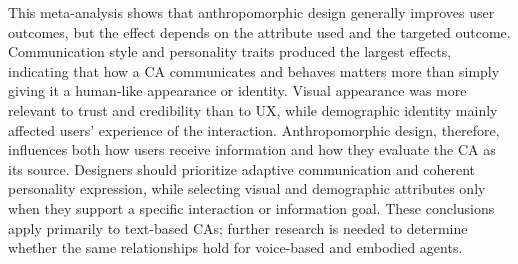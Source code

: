 \documentclass[preprint,review,12pt,authoryear,nonatbib]{elsarticle}
\begin{document}
This meta-analysis shows that anthropomorphic design generally improves user outcomes, but the effect depends on the attribute used and the targeted outcome. Communication style and personality traits produced the largest effects, indicating that how a CA communicates and behaves matters more than simply giving it a human-like appearance or identity. Visual appearance was more relevant to trust and credibility than to UX, while demographic identity mainly affected users' experience of the interaction. Anthropomorphic design, therefore, influences both how users receive information and how they evaluate the CA as its source. Designers should prioritize adaptive communication and coherent personality expression, while selecting visual and demographic attributes only when they support a specific interaction or information goal. These conclusions apply primarily to text-based CAs; further research is needed to determine whether the same relationships hold for voice-based and embodied agents.

\printbibliography[title={References}]
\end{document}
